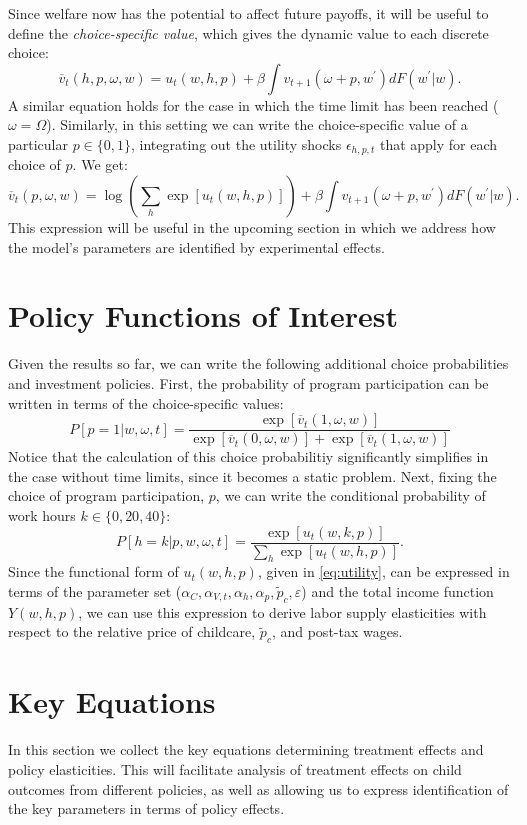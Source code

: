 \documentclass[12pt]{article}
\newcommand\ov{\overline}
\newcommand\eps{\epsilon}
\numberwithin{equation}{section}
\numberwithin{figure}{section}
\numberwithin{table}{section}
\begin{document}
Since welfare now has the potential to affect future payoffs, it will be useful to define the \emph{choice-specific value}, which gives the dynamic value to each discrete choice:
\[\ov{v}_t(h,p,\omega,w) = u_{t}(w,h,p) + \beta\int v_{t+1}(\omega+p,w^\prime)dF(w^\prime|w).\]
A similar equation holds for the case in which the time limit has been reached ($\omega=\Omega$). Similarly, in this setting we can write the choice-specific value of a particular $p\in\{0,1\}$, integrating out the utility shocks $\eps_{h,p,t}$ that apply for each choice of $p$. We get:
\[\ov{v}_t(p,\omega,w) = \log\left(\sum_h\exp[u_{t}(w,h,p)]\right) + \beta\int v_{t+1}(\omega+p,w^\prime)dF(w^\prime|w).\]
This expression will be useful in the upcoming section in which we address how the model's parameters are identified by experimental effects.

\section{Policy Functions of Interest}
Given the results so far, we can write the following additional choice probabilities and investment policies. First, the probability of program participation can be written in terms of the choice-specific values:
\[P[p=1|w,\omega,t] = \frac{\exp[\ov{v}_t(1,\omega,w)]}{\exp[\ov{v}_t(0,\omega,w)]+\exp[\ov{v}_t(1,\omega,w)]} \]
Notice that the calculation of this choice probabilitiy significantly simplifies in the case without time limits, since it becomes a static problem. Next, fixing the choice of program participation, $p$, we can write the conditional probability of work hours $k\in\{0,20,40\}$:
\[P[h=k|p,w,\omega,t] = \frac{\exp[u_t(w,k,p)]}{\sum_h\exp[u_t(w,h,p)]}. \]
Since the functional form of $u_t(w,h,p)$, given in \eqref{eq:utility}, can be expressed in terms of the parameter set ($\alpha_C,\alpha_{V,t},\alpha_h,\alpha_p,\tilde{p}_c,\varepsilon$) and the total income function $Y(w,h,p)$, we can use this expression to derive labor supply elasticities with respect to the relative price of childcare, $\tilde{p}_c$, and post-tax wages.


\section{Key Equations}
In this section we collect the key equations determining treatment effects and policy elasticities. This will facilitate analysis of treatment effects on child outcomes from different policies, as well as allowing us to express identification of the key parameters in terms of policy effects.
\end{document}
